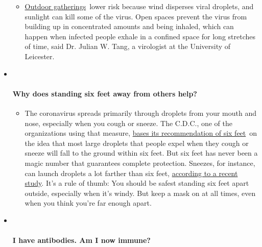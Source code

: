 \begin{itemize}
  \begin{itemize}
  \tightlist
  \item
    \href{https://www.nytimes3xbfgragh.onion/2020/05/15/us/coronavirus-what-to-do-outside.html?action=click\&pgtype=Article\&state=default\&region=MAIN_CONTENT_3\&context=storylines_faq}{Outdoor
    gatherings}~lower risk because wind disperses viral droplets, and
    sunlight can kill some of the virus. Open spaces prevent the virus
    from building up in concentrated amounts and being inhaled, which
    can happen when infected people exhale in a confined space for long
    stretches of time, said Dr. Julian W. Tang, a virologist at the
    University of Leicester.
  \end{itemize}
\item ~
  \hypertarget{why-does-standing-six-feet-away-from-others-help}{%
  \paragraph{Why does standing six feet away from others
  help?}\label{why-does-standing-six-feet-away-from-others-help}}

  \begin{itemize}
  \tightlist
  \item
    The coronavirus spreads primarily through droplets from your mouth
    and nose, especially when you cough or sneeze. The C.D.C., one of
    the organizations using that measure,
    \href{https://www.nytimes3xbfgragh.onion/2020/04/14/health/coronavirus-six-feet.html?action=click\&pgtype=Article\&state=default\&region=MAIN_CONTENT_3\&context=storylines_faq}{bases
    its recommendation of six feet}~on the idea that most large droplets
    that people expel when they cough or sneeze will fall to the ground
    within six feet. But six feet has never been a magic number that
    guarantees complete protection. Sneezes, for instance, can launch
    droplets a lot farther than six feet,
    \href{https://jamanetwork.com/journals/jama/fullarticle/2763852}{according
    to a recent study}. It's a rule of thumb: You should be safest
    standing six feet apart outside, especially when it's windy. But
    keep a mask on at all times, even when you think you're far enough
    apart.
  \end{itemize}
\item ~
  \hypertarget{i-have-antibodies-am-i-now-immune}{%
  \paragraph{I have antibodies. Am I now
  immune?}\label{i-have-antibodies-am-i-now-immune}}


\end{itemize}
